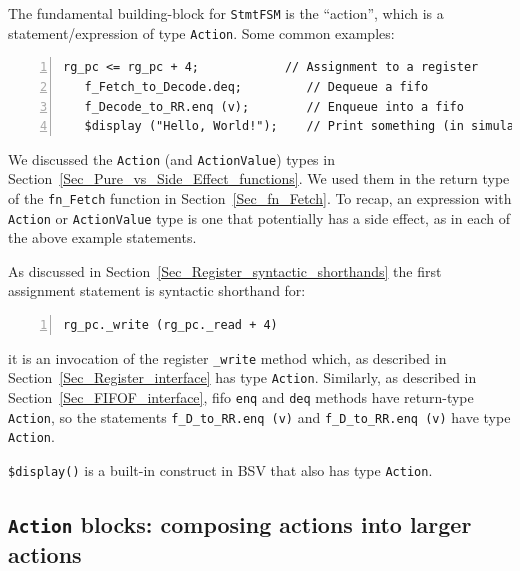 
The fundamental building-block for \verb|StmtFSM| is the ``action'',
which is a statement/expression of type \verb|Action|.  Some common
examples:

{\small
\begin{Verbatim}[frame=single, numbers=left]
   rg_pc <= rg_pc + 4;            // Assignment to a register
   f_Fetch_to_Decode.deq;         // Dequeue a fifo
   f_Decode_to_RR.enq (v);        // Enqueue into a fifo
   $display ("Hello, World!");    // Print something (in simulation only)
\end{Verbatim}
}

We discussed the \verb|Action| (and \verb|ActionValue|) types in
Section~\ref{Sec_Pure_vs_Side_Effect_functions}.  We used them in the
return type of the \verb|fn_Fetch| function in
Section~\ref{Sec_fn_Fetch}.  To recap, an expression with
\verb|Action| or \verb|ActionValue| type is one that potentially has a
side effect, as in each of the above example statements.

As discussed in Section~\ref{Sec_Register_syntactic_shorthands} the
first assignment statement is syntactic shorthand for:

{\small
\begin{Verbatim}[frame=single, numbers=left]
   rg_pc._write (rg_pc._read + 4)
\end{Verbatim}
}

{\ie} it is an invocation of the register \verb|_write| method which,
as described in
Section~\ref{Sec_Register_interface} has type
\verb|Action|.  Similarly, as described in
Section~\ref{Sec_FIFOF_interface}, fifo \verb|enq|
and \verb|deq| methods have return-type \verb|Action|, so the
statements \verb|f_D_to_RR.enq (v)| and \verb|f_D_to_RR.enq (v)| have
type \verb|Action|.


\verb|$display()| is a built-in construct in BSV that also has type
\verb|Action|.


\subsection{{\tt Action} blocks: composing actions into larger actions}


